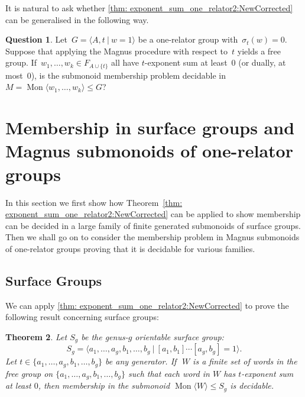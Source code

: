 \documentclass[11pt]{amsart}
\newcommand{\Mgen}[1]{\operatorname{Mon}\bigl\langle #1 \bigr\rangle}
\newcommand{\Gpres}[2]{\bigl\langle #1\:|\:#2 \bigr\rangle}
\theoremstyle{plain}
\newtheorem{theorem}{Theorem}[section]
\theoremstyle{definition}
\newtheorem{question}[theorem]{Question}
\begin{document}
It is natural to ask whether 
\cref{thm: exponent_sum_one_relator2:NewCorrected} can be generalised in the following way. 


\begin{question}
  Let~$G = \Gpres{A, t}{w = 1}$ be a one-relator group with~$\sigma_t(w) = 0$. Suppose that applying the Magnus procedure with respect to~$t$ yields a free group. If~$w_1, \ldots, w_k \in F_{A \cup \{ t \}}$ all have $t$-exponent sum at least~$0$ (or dually, at most~$0$), is the submonoid membership problem decidable in $M = \Mgen{w_1, \ldots, w_k} \leqslant G$?    
\end{question}




\section{Membership in surface groups and Magnus submonoids of one-relator groups}\label{sec: Magnus submonoid membership problem in one-relator groups} 

In this section we first show how Theorem~\ref{thm: exponent_sum_one_relator2:NewCorrected} can be applied to show membership can be decided in a large family of finite generated submonoids of surface groups. Then we shall go on to consider the membership problem in Magnus submonoids of one-relator groups proving that it is decidable for various families.  





\subsection{Surface Groups}

We can apply \cref{thm: exponent_sum_one_relator2:NewCorrected} to prove the following result concerning surface groups:

\begin{theorem}\label{thm:PositiveSubonoidsOfSurfaceGroups} 
Let $S_g$ be the genus-$g$ orientable surface group: 
\[
S_g = \Gpres{a_1, \ldots, a_g, b_1, \ldots, b_g}{[a_1,b_1]\cdots[a_g,b_g]= 1}.
\]
Let $t \in \{ a_1, \ldots, a_g, b_1, \ldots, b_g \}$ be any generator. If~$\,W$ is a finite set of words in the free group on 
$\{ a_1,\ldots,a_g,b_1,\ldots,b_g \}$ 
such that each word in $W$ has $t$-exponent sum at least $0$, then membership in the submonoid $\Mgen{W} \leq S_g$ is decidable.
\end{theorem}
\end{document}
